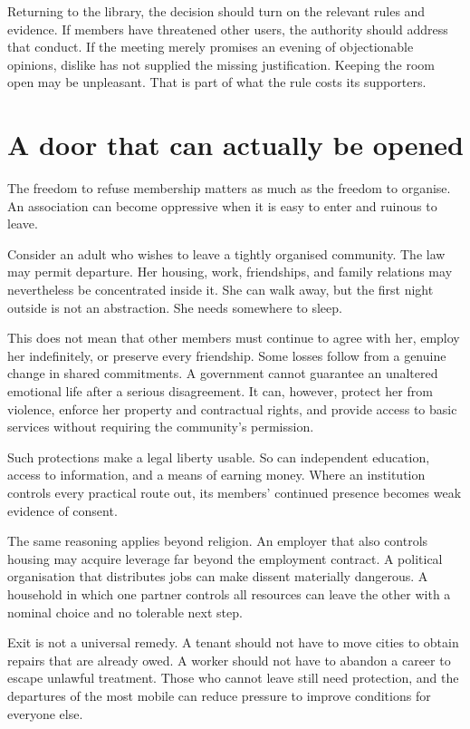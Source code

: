 \documentclass[12pt,a4paper]{book}
\begin{document}
Returning to the library, the decision should turn on the relevant rules and evidence. If members have threatened other users, the authority should address that conduct. If the meeting merely promises an evening of objectionable opinions, dislike has not supplied the missing justification. Keeping the room open may be unpleasant. That is part of what the rule costs its supporters.

\section*{A door that can actually be opened}

The freedom to refuse membership matters as much as the freedom to organise. An association can become oppressive when it is easy to enter and ruinous to leave.

Consider an adult who wishes to leave a tightly organised community. The law may permit departure. Her housing, work, friendships, and family relations may nevertheless be concentrated inside it. She can walk away, but the first night outside is not an abstraction. She needs somewhere to sleep.

This does not mean that other members must continue to agree with her, employ her indefinitely, or preserve every friendship. Some losses follow from a genuine change in shared commitments. A government cannot guarantee an unaltered emotional life after a serious disagreement. It can, however, protect her from violence, enforce her property and contractual rights, and provide access to basic services without requiring the community's permission.

Such protections make a legal liberty usable. So can independent education, access to information, and a means of earning money. Where an institution controls every practical route out, its members' continued presence becomes weak evidence of consent.

The same reasoning applies beyond religion. An employer that also controls housing may acquire leverage far beyond the employment contract. A political organisation that distributes jobs can make dissent materially dangerous. A household in which one partner controls all resources can leave the other with a nominal choice and no tolerable next step.

Exit is not a universal remedy. A tenant should not have to move cities to obtain repairs that are already owed. A worker should not have to abandon a career to escape unlawful treatment. Those who cannot leave still need protection, and the departures of the most mobile can reduce pressure to improve conditions for everyone else.
\end{document}
